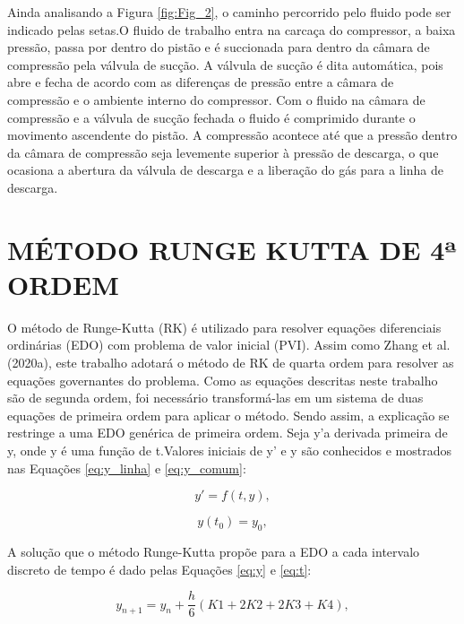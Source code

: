Ainda analisando a Figura \ref{fig:Fig_2}, o caminho percorrido pelo fluido pode ser indicado pelas setas.O fluido de trabalho entra na carcaça do compressor, a baixa pressão, passa por dentro do pistão e é succionada para dentro da câmara de compressão pela válvula de sucção. A válvula de sucção é dita automática, pois abre e fecha de acordo com as diferenças de pressão entre a câmara de compressão e o ambiente interno do compressor. Com o fluido na câmara de compressão e a válvula de sucção fechada o fluido é comprimido durante o movimento ascendente do pistão. A compressão acontece até que a pressão dentro da câmara de compressão seja levemente superior à pressão de descarga, o que ocasiona a abertura da válvula de descarga e a liberação do gás para a linha de descarga.



\section{MÉTODO RUNGE KUTTA DE 4ª ORDEM}

O método de Runge-Kutta (RK) é utilizado para resolver equações diferenciais ordinárias (EDO) com problema de valor inicial (PVI). Assim como Zhang et al. (2020a), este trabalho adotará o método de RK de quarta ordem para resolver as equações governantes do problema. Como as equações descritas neste trabalho são de segunda ordem, foi necessário transformá-las em um sistema de duas equações de primeira ordem para aplicar o método. Sendo assim, a explicação se restringe a uma EDO genérica de primeira ordem.
Seja y'a derivada primeira de y, onde y é uma função de t.Valores iniciais de y' e y são conhecidos e mostrados nas Equações \ref{eq:y_linha} e \ref{eq:y_comum}:



\begin{equation}\label{eq:y_linha}
y' = f(t,y),
\end{equation}


\begin{equation}\label{eq:y_comum}
y(t_0)=y_0,
\end{equation}


A solução que o método Runge-Kutta propõe para a EDO a cada intervalo discreto de tempo é dado pelas Equações \ref{eq:y} e \ref{eq:t}:




\begin{equation}\label{eq:y}
y_{n+1}=y_n+ \frac{h}{6}(K1+2K2+2K3+K4),
\end{equation}


